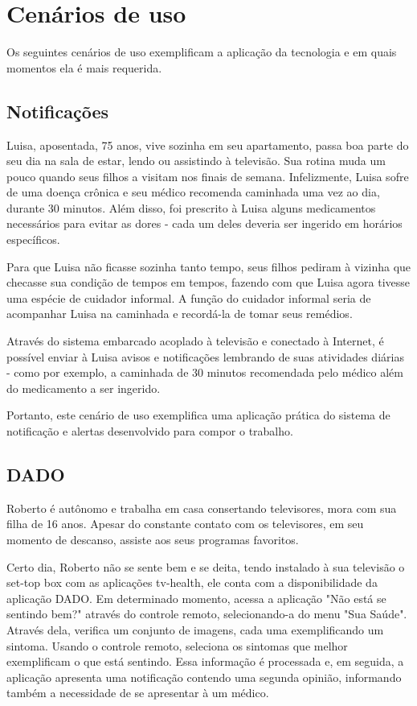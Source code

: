 \section{Cenários de uso} \label{sec:cenarios-de-uso}

Os seguintes cenários de uso exemplificam a aplicação da tecnologia e em quais
momentos ela é mais requerida.

\subsection{Notificações}\label{subsec:notificacoes}

Luisa, aposentada, 75 anos, vive sozinha em seu apartamento, passa boa parte do
seu dia na sala de estar, lendo ou assistindo à televisão. Sua rotina muda um
pouco quando seus filhos a visitam nos finais de semana. Infelizmente, Luisa
sofre de uma doença crônica e seu médico recomenda caminhada uma vez ao dia,
durante 30 minutos. Além disso, foi prescrito à Luisa alguns medicamentos
necessários para evitar as dores - cada um deles deveria ser ingerido em
horários específicos.

Para que Luisa não ficasse sozinha tanto tempo, seus filhos pediram à vizinha
que checasse sua condição de tempos em tempos, fazendo com que Luisa agora tivesse uma
espécie de cuidador informal. A função do cuidador informal seria de acompanhar
Luisa na caminhada e recordá-la de tomar seus remédios.

Através do sistema embarcado acoplado à televisão e conectado à Internet, é
possível enviar à Luisa avisos e notificações lembrando de suas atividades
diárias - como por exemplo, a caminhada de 30 minutos recomendada pelo
médico além do medicamento a ser ingerido.

Portanto, este cenário de uso exemplifica uma aplicação prática do sistema de
notificação e alertas desenvolvido para compor o trabalho.

\subsection{DADO}\label{subsec:dado}

Roberto é autônomo e trabalha em casa consertando televisores, mora com sua
filha de 16 anos. Apesar do constante contato com os televisores, em seu momento
de descanso, assiste aos seus programas favoritos.

Certo dia, Roberto não se sente bem e se deita, tendo instalado à sua televisão
o set-top box com as aplicações tv-health, ele conta com a disponibilidade da
aplicação DADO. Em determinado momento, acessa a aplicação "Não está se sentindo
bem?" através do controle remoto, selecionando-a do menu "Sua Saúde". Através
dela, verifica um conjunto de imagens, cada uma exemplificando um sintoma.
Usando o controle remoto, seleciona os sintomas que melhor exemplificam o que
está sentindo. Essa informação é processada e, em seguida, a aplicação apresenta
uma notificação contendo uma segunda opinião, informando também a necessidade de
se apresentar à um médico.


